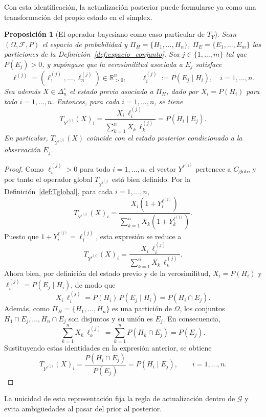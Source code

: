\documentclass[12pt]{article}
\newtheorem{proposicion}{Proposición}[section]
\begin{document}
Con esta identificación, la actualización posterior puede formularse ya como una transformación del propio estado en el símplex.
\begin{proposicion}[El operador bayesiano como caso particular de $T_Y$]\label{prop:bayes_como_TY}
Sean $(\Omega,\mathcal F,P)$ el espacio de probabilidad y $\Pi_H=\{H_1,\dots,H_n\}$, $\Pi_E=\{E_1,\dots,E_m\}$ las particiones de la Definición~\ref{def:espacio_conjunto}. Sea $j\in\{1,\dots,m\}$ tal que $P(E_j)>0$, y supóngase que la verosimilitud asociada a $E_j$ satisface
\[
\ell^{(j)}=(\ell_1^{(j)},\dots,\ell_n^{(j)})\in\mathbb R_{>0}^n,
\qquad
\ell_i^{(j)}:=P(E_j\mid H_i),\quad i=1,\dots,n.
\]
Sea además $X\in\Delta_n^\circ$ el estado previo asociado a $\Pi_H$, dado por $X_i=P(H_i)$ para todo $i=1,\dots,n$. Entonces, para cada $i=1,\dots,n$, se tiene
\[
T_{Y^{\ell^{(j)}}}(X)_i
=
\frac{X_i\,\ell_i^{(j)}}{\displaystyle\sum_{k=1}^n X_k\,\ell_k^{(j)}}
=
P(H_i\mid E_j).
\]
En particular, $T_{Y^{\ell^{(j)}}}(X)$ coincide con el estado posterior condicionado a la observación $E_j$.
\end{proposicion}

\begin{proof}
Como $\ell_i^{(j)}>0$ para todo $i=1,\dots,n$, el vector $Y^{\ell^{(j)}}$ pertenece a $C_{\mathrm{glob}}$, y por tanto el operador global $T_{Y^{\ell^{(j)}}}$ está bien definido. Por la Definición~\ref{def:Tglobal}, para cada $i=1,\dots,n$,
\[
T_{Y^{\ell^{(j)}}}(X)_i
=
\frac{X_i(1+Y_i^{\ell^{(j)}})}{\sum_{k=1}^n X_k(1+Y_k^{\ell^{(j)}})}.
\]
Puesto que $1+Y_i^{\ell^{(j)}}=\ell_i^{(j)}$, esta expresión se reduce a
\[
T_{Y^{\ell^{(j)}}}(X)_i
=
\frac{X_i\,\ell_i^{(j)}}{\sum_{k=1}^n X_k\,\ell_k^{(j)}}.
\]
Ahora bien, por definición del estado previo y de la verosimilitud, $X_i=P(H_i)$ y $\ell_i^{(j)}=P(E_j\mid H_i)$, de modo que
\[
X_i\,\ell_i^{(j)}=P(H_i)\,P(E_j\mid H_i)=P(H_i\cap E_j).
\]
Además, como $\Pi_H=\{H_1,\dots,H_n\}$ es una partición de $\Omega$, los conjuntos $H_1\cap E_j,\dots,H_n\cap E_j$ son disjuntos y su unión es $E_j$. En consecuencia,
\[
\sum_{k=1}^n X_k\,\ell_k^{(j)}=\sum_{k=1}^n P(H_k\cap E_j)=P(E_j).
\]
Sustituyendo estas identidades en la expresión anterior, se obtiene
\[
T_{Y^{\ell^{(j)}}}(X)_i
=
\frac{P(H_i\cap E_j)}{P(E_j)}
=
P(H_i\mid E_j),
\qquad i=1,\dots,n.
\]
\end{proof}

La unicidad de esta representación fija la regla de actualización dentro de $\mathcal G$ y evita ambigüedades al pasar del prior al posterior.

\end{document}
